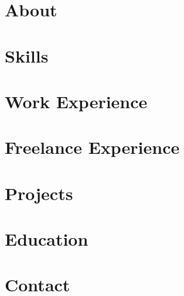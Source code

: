 \documentclass[a4,10pt]{article}
\begin{document}



\section{About}

\vspace{-0.2cm}

\section{Skills}



\section{Work Experience}



\section{Freelance Experience}






\section{Projects} %


\section{Education}


\section{Contact}

\end{document}

